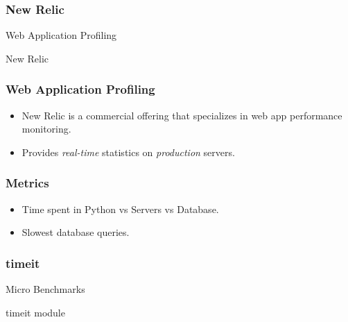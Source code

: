 \documentclass[c,english]{beamer}
\begin{document}
\begin{frame}[fragile]
\frametitle{New Relic}


\begin{block}{ \centering \LARGE Web Application Profiling }

\centering \Large New Relic

\end{block}
\end{frame}

\begin{frame}[fragile]
\frametitle{Web Application Profiling}

\begin{itemize}

\item New Relic is a commercial offering that specializes in web app performance monitoring.

\item Provides \emph{real-time} statistics on \emph{production} servers.
\end{itemize}
\end{frame}

\begin{frame}[fragile]
\frametitle{Metrics}

\begin{itemize}

\item Time spent in Python vs Servers vs Database.

\item Slowest database queries.
\end{itemize}
\end{frame}

\begin{frame}[fragile]
\frametitle{timeit}


\begin{block}{ \centering \LARGE Micro Benchmarks }

\centering \Large timeit module

\end{block}
\end{frame}
\end{document}
